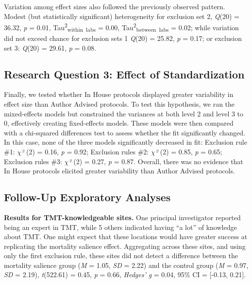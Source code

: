 \documentclass[man]{apa6}
\begin{document}
Variation among effect sizes also followed the previously observed pattern. Modest (but statistically significant) heterogeneity for exclusion set 2, \emph{Q}(20) = 36.32, \emph{p} = 0.01, Tau\textsuperscript{2}\textsubscript{within~labs} = 0.00, Tau\textsuperscript{2}\textsubscript{between~labs} = 0.02; while variation did not exceed chance for exclusion sets 1 \emph{Q}(20) = 25.82, \emph{p} = 0.17; or exclusion set 3: \emph{Q}(20) = 29.61, \emph{p} = 0.08.

\hypertarget{research-question-3-effect-of-standardization}{%
\subsection{Research Question 3: Effect of Standardization}\label{research-question-3-effect-of-standardization}}

Finally, we tested whether In House protocols displayed greater variability in effect size than Author Advised protocols. To test this hypothesis, we ran the mixed-effects models but constrained the variances at both level 2 and level 3 to 0, effectively creating fixed-effects models. These models were then compared with a chi-squared differences test to assess whether the fit significantly changed. In this case, none of the three models significantly decreased in fit: Exclusion rule \#1: \emph{\(\chi\)²} (2) = 0.16, \emph{p} = 0.92; Exclusion rules \#2: \emph{\(\chi\)²} (2) = 0.85, \emph{p} = 0.65; Exclusion rules \#3: \emph{\(\chi\)²} (2) = 0.27, \emph{p} = 0.87. Overall, there was no evidence that In House protocols elicited greater variability than Author Advised protocols.

\hypertarget{follow-up-exploratory-analyses}{%
\subsection{Follow-Up Exploratory Analyses}\label{follow-up-exploratory-analyses}}

\textbf{Results for TMT-knowledgeable sites.} One principal investigator reported being an expert in TMT, while 5 others indicated having \enquote{a lot} of knowledge about TMT. One might expect that these locations would have greater success at replicating the mortality salience effect. Aggregating across these sites, and using only the first exclusion rule, these sites did not detect a difference between the mortality salience group (\emph{M} = 1.05, \emph{SD} = 2.22) and the control group (\emph{M} = 0.97, \emph{SD} = 2.19), \emph{t}(522.61) = 0.45, \emph{p} = 0.66, \emph{Hedges' g} = 0.04, 95\% CI = {[}-0.13, 0.21{]}.
\end{document}
